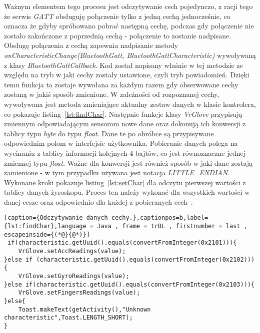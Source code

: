 Ważnym elementem tego procesu jest odczytywanie cech pojedynczo, z racji tego że serwis \textit{GATT} obsługuję połączenie tylko z jedną cechą jednocześnie, co oznacza że gdyby spróbowano pobrać następną cechę, podczas gdy połączenie nie zostało zakończone z poprzednią cechą - połączenie to zostanie nadpisane. Obsługę połączenia z cechą zapewnia nadpisanie metody \textit{onCharacteristicChange(BluetoothGatt, BluetoothGattCharacteristic)} wywoływaną  z klasy \textit{BluetoothGattCallback}. Kod został napisany właśnie w tej metodzie ze względu na tryb w jaki cechy zostały ustawione, czyli tryb powiadomień. Dzięki temu funkcja ta zostaje wywołana za każdym razem gdy obserwowane cechy zostaną w jakiś sposób zmienione. W zależności od rozpoznanej cechy, wywoływana jest metoda zmieniające aktualny zestaw danych w klasie kontrolera, co pokazuje listing~\ref{lst:findChar}. Następnie funkcje klasy \textit{VrGlove} przypisują zmiennym odpowiadającym sensorom nowe dane oraz dokonują ich konwersji z tablicy typu \textit{byte} do typu \textit{float}. Dane te po obróbce są przypisywane odpowiednim polom w interfejsie użytkownika. Pobieranie danych polega na wycinaniu z tablicy informacji kolejnych 4 bajtów, co jest równoznaczne jednej zmiennej typu \textit{float}. Ważne dla konwersji jest również sposób w jaki dane zostają zamienione - w tym przypadku używana jest notacja \textit{LITTLE\_ENDIAN}. Wykonane kroki pokazuje listing~\ref{lst:setChar} dla odczytu pierwszej wartości z tablicy danych żyroskopu. Proces ten należy wykonać dla wszystkich wartości w danej cesze oraz odpowiednio dla każdej z pobieranych cech~\cite{AndroidDoc}.
\begin{lstlisting}[caption={Odczytywanie danych cechy.},captionpos=b,label={lst:findChar},language = Java , frame = trBL , firstnumber = last , escapeinside={(*@}{@*)}]     
 if(characteristic.getUuid().equals(convertFromInteger(0x2101))){
	VrGlove.setAccReadings(value);
}else if (characteristic.getUuid().equals(convertFromInteger(0x2102))){
	VrGlove.setGyroReadings(value);
}else if(characteristic.getUuid().equals(convertFromInteger(0x2103))){
	VrGlove.setFingersReadings(value);
}else{
	Toast.makeText(getActivity(),"Unknown characteristic",Toast.LENGTH_SHORT);
}                                                   
\end{lstlisting}

